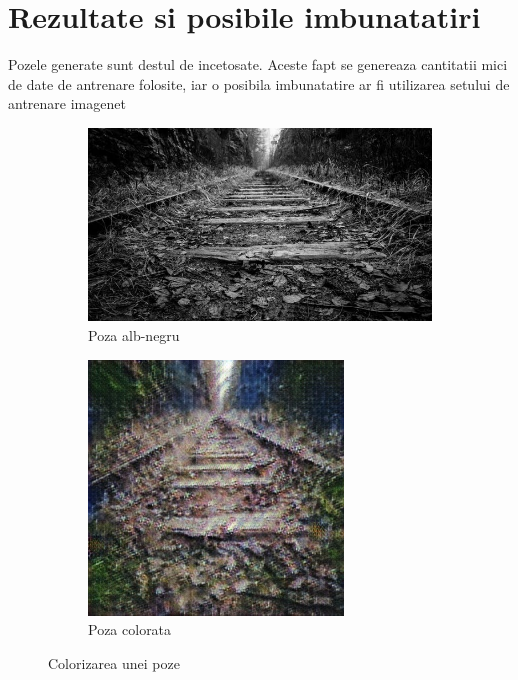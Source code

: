 \documentclass[12pt]{article}
\theoremstyle{definition}
\begin{document}
\section{Rezultate si posibile imbunatatiri}

Pozele generate sunt destul de incetosate.
Aceste fapt se genereaza cantitatii mici de date de antrenare folosite, iar o posibila imbunatatire ar fi utilizarea setului de antrenare imagenet

\begin{figure}[h!]
	\centering
	\begin{subfigure}{0.4\textwidth}
		\includegraphics[width=\linewidth]{input_sample.jpg}
		\caption{Poza alb-negru}
	\end{subfigure}
	\vspace{1em}
	\begin{subfigure}{0.4\textwidth}
		\includegraphics[width=\textwidth]{output_sample.jpg}
		\caption{Poza colorata}
	\end{subfigure}
	\caption{Colorizarea unei poze}
\end{figure}
\end{document}
